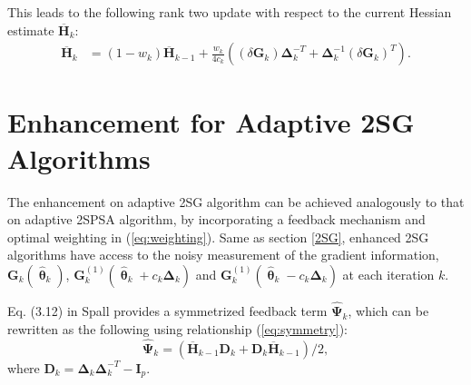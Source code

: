 \documentclass[conference,10.3cpt]{IEEEtran}
\newcommand{\bD}{\bm{D}}
\newcommand{\bG}{\bm{G}}
\newcommand{\bI}{\bm{I}}
\newcommand{\bDelta}{\bm{\Delta}}
\newcommand{\oH}{\bm{\overline{H}}}
\newcommand{\hPsi}{\bm{\hat{\Psi}}}
\newcommand{\htheta}{\bm{\hat{\uptheta}}}
\newcommand{\remove}[1]{}
\begin{document}
This leads to the following rank two update with respect to
the current Hessian estimate $\oH_k$:
\begin{align*}
\oH_k &= (1 - w_k) \oH_{k-1} + \frac{w_k}{4c_k} ((\delta\bG_k)\bDelta_k^{-T}+\bDelta_k^{-1}(\delta\bG_k)^{T}).
\end{align*} \remove{ Above gives a rank-two update from $
  \oH_{k-1}^{-1} $ to $ \oH_{k}^{-1} $. Write the sequential recursions
  for the $ \oH_k^{-1} $ as following:
  \begin{equation} \label{eq:2SGSequentialUpdate}
    \begin{dcases} \bm{B}_k^{-1}
      &=\frac{k+1}{k}\oH_{k-1}^{-1}-(\frac{k+1}{k})^2\oH_{k-1}^{-1}(\delta\bG_k)\\
      &~~~\cdot(b_k^{-1}+\frac{k+1}{k}\bDelta_k^{-T}\oH_{k-1}^{-1}(\delta\bG_k)\bDelta_k^{-T}\oH_{k-1}^{-1}\\
      \oH_k^{-1} &=\bm{B}_k^{-1}-\bm{B}_k^{-1}\bDelta_k^{-1}\\
      &~~~\cdot(b_k^{-1}+(\delta\bG_k)^{T}\bm{B}_k^{-1}\bDelta_k^{-1})^{-1}(\delta\bG_k)^{T}\bm{B}_k^{-1}
    \end{dcases}
  \end{equation} where
  \begin{equation}\label{eq:2SGB}
    \bm{B}_k=\frac{k}{k+1}\oH_{k-1}+b_k(\delta\bG_k)\bDelta_k^{-T}
  \end{equation}}

\section{Enhancement for Adaptive 2SG Algorithms}  \label{Enhanced 2SG}
 The enhancement on adaptive 2SG algorithm can be achieved analogously to that on adaptive 2SPSA algorithm, by incorporating a feedback
 mechanism and optimal weighting in (\ref{eq:weighting}). Same as section \ref{2SG}, enhanced 2SG algorithms have access
 to the noisy measurement of the gradient information,
 $\bG_k(\htheta_k)$, $\bG_k^{(1)}(\htheta_k+ c_k\bDelta_k)$ and
 $\bG_k^{(1)}(\htheta_k- c_k\bDelta_k)$ at each iteration $k$.

	Eq. (3.12) in Spall \cite{Spall2009} provides a symmetrized feedback term $ \hPsi_k $, which can be rewritten as the following using relationship (\ref{eq:symmetry}):
	\begin{equation}
	\hPsi_k =(\oH_{k-1}\bD_k+\bD_k\oH_{k-1})/2,
	\end{equation}
	where $ \bD_k=\bDelta_k\bDelta_k^{-T}-\bI_p$.
\end{document}
